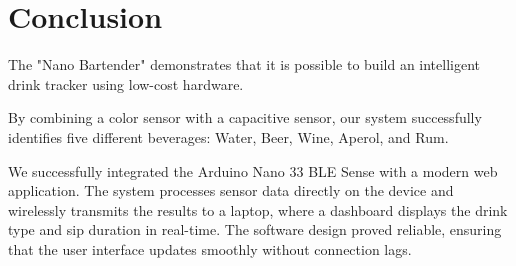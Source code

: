 \documentclass[12pt]{article}
\begin{document}
\section{Conclusion}
The "Nano Bartender" demonstrates that it is possible to build an intelligent drink tracker using low-cost hardware. 

By combining a color sensor with a capacitive sensor, our system successfully identifies five different beverages: Water, Beer, Wine, Aperol, and Rum.

We successfully integrated the Arduino Nano 33 BLE Sense with a modern web application. The system processes sensor data directly on the device and wirelessly transmits the results to a laptop, where a dashboard displays the drink type and sip duration in real-time. The software design proved reliable, ensuring that the user interface updates smoothly without connection lags.
\end{document}
